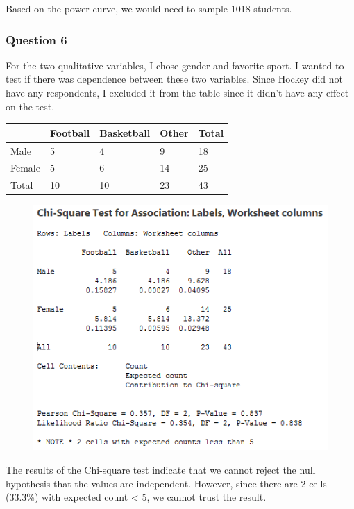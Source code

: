 \documentclass{article}
\begin{document}
Based on the power curve, we would need to sample 1018 students.

\newpage
    \subsubsection{Question 6}\label{question-6}

For the two qualitative variables, I chose gender and favorite sport. I
wanted to test if there was dependence between these two variables.
Since Hockey did not have any respondents, I excluded it from the table
since it didn't have any effect on the test.

\begin{longtable}[c]{@{}lllll@{}}
\toprule
& Football & Basketball & Other & Total\tabularnewline
\midrule
\endhead
Male & 5 & 4 & 9 & 18\tabularnewline
Female & 5 & 6 & 14 & 25\tabularnewline
Total & 10 & 10 & 23 & 43\tabularnewline
\bottomrule
\end{longtable}

\begin{figure}[h!]
 \centering
 \includegraphics[scale=.7,keepaspectratio=true]{./project_files/chi-square-test_gender-vs-sports.png}
\end{figure}


The results of the Chi-square test indicate that we cannot reject the
null hypothesis that the values are independent. However, since there
are 2 cells (33.3\%) with expected count \textless{} 5, we cannot trust
the result.


    
    
    
    
\end{document}
